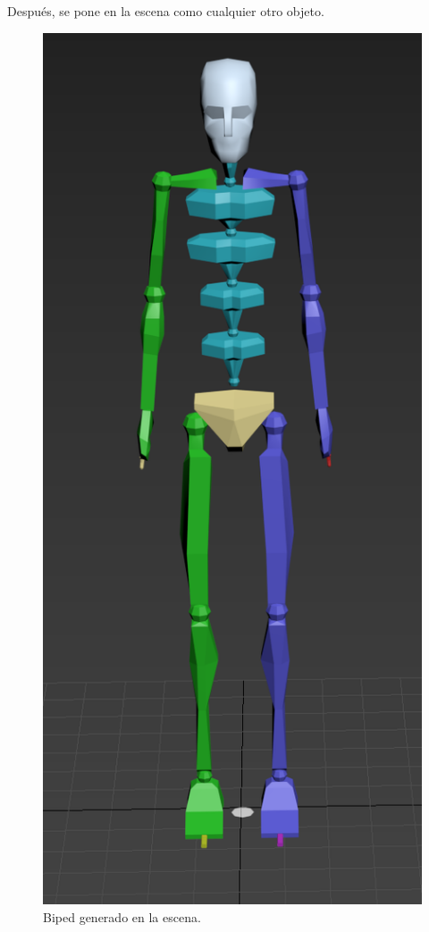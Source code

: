 \documentclass{article}
\begin{document}
Después, se pone en la escena como cualquier otro objeto.

\begin{figure}[H]
   \centering
   \includegraphics[width=\textwidth]{imagenes/biped.png}
   \caption{Biped generado en la escena.}
\end{figure}
\end{document}
